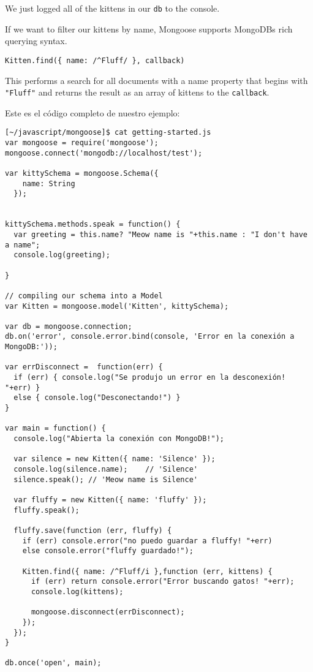 We just logged all of the kittens in our \verb|db| to the console. 

If we want to filter our kittens by name, Mongoose supports MongoDBs rich querying syntax.

\begin{verbatim}
Kitten.find({ name: /^Fluff/ }, callback)
\end{verbatim}
This performs a search for all documents with a name property that begins with \verb|"Fluff"| 
and returns the result as an array of kittens to the \verb|callback|.

Este es el código completo de nuestro ejemplo:

\begin{verbatim}
[~/javascript/mongoose]$ cat getting-started.js 
var mongoose = require('mongoose');
mongoose.connect('mongodb://localhost/test');

var kittySchema = mongoose.Schema({
    name: String
  });


kittySchema.methods.speak = function() {
  var greeting = this.name? "Meow name is "+this.name : "I don't have a name";
  console.log(greeting);

}

// compiling our schema into a Model
var Kitten = mongoose.model('Kitten', kittySchema);

var db = mongoose.connection;
db.on('error', console.error.bind(console, 'Error en la conexión a MongoDB:'));

var errDisconnect =  function(err) {
  if (err) { console.log("Se produjo un error en la desconexión! "+err) }
  else { console.log("Desconectando!") }
}

var main = function() {
  console.log("Abierta la conexión con MongoDB!");

  var silence = new Kitten({ name: 'Silence' });
  console.log(silence.name);    // 'Silence'
  silence.speak(); // 'Meow name is Silence'

  var fluffy = new Kitten({ name: 'fluffy' });
  fluffy.speak();

  fluffy.save(function (err, fluffy) {
    if (err) console.error("no puedo guardar a fluffy! "+err)
    else console.error("fluffy guardado!");

    Kitten.find({ name: /^Fluff/i },function (err, kittens) {
      if (err) return console.error("Error buscando gatos! "+err);
      console.log(kittens);

      mongoose.disconnect(errDisconnect);
    });
  });
}

db.once('open', main);
\end{verbatim}
